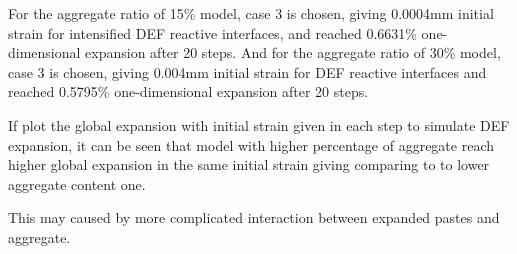 For the aggregate ratio of 15\% model, case 3 is chosen, giving 0.0004mm initial strain for intensified DEF reactive interfaces, and reached 0.6631\% one-dimensional expansion after 20 steps. And for the aggregate ratio of 30\% model, case 3 is chosen, giving 0.004mm initial strain for DEF reactive interfaces and reached 0.5795\% one-dimensional expansion after 20 steps.

If plot the global expansion with initial strain given in each step to simulate DEF expansion, it can be seen that model with higher percentage of aggregate reach higher global expansion in the same initial strain giving comparing to to lower aggregate content one. %

This may caused by more complicated interaction between expanded pastes and aggregate.

\clearpage


